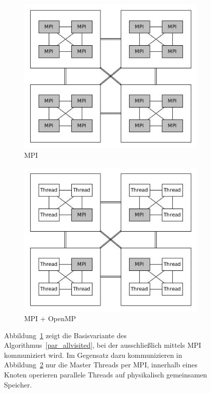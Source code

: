 \documentclass[11pt,a4paper]{article}
\begin{document}
\begin{figure}[h]
    \centering
    \begin{subfigure}[b]{0.45\textwidth}
        \includegraphics[width=1\textwidth]{purempi}
        \caption{MPI}
        \label{fig:purempi}
    \end{subfigure}
   \qquad
    \begin{subfigure}[b]{0.45\textwidth}
        \includegraphics[width=1\textwidth]{hybridmasteronly}
        \caption{MPI + OpenMP}
        \label{fig:hybridmasteronly}
    \end{subfigure}
    \caption{Abbildung~\ref{fig:purempi} zeigt die Basisvariante des Algorithmus~\ref{par_allvisited}, bei der ausschließlich mittels MPI kommuniziert wird. Im Gegensatz dazu kommunizieren in Abbildung~\ref{fig:hybridmasteronly} nur die Master Threads per MPI, innerhalb eines Knoten operieren parallele Threads auf physikalisch gemeinsamen Speicher.}
\label{fig:normalandhybrid}
\end{figure}
\end{document}
